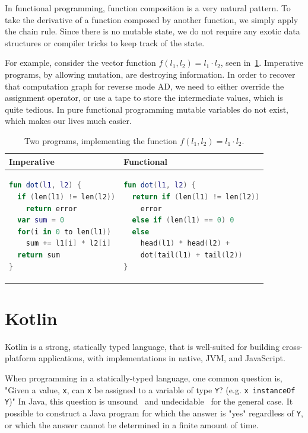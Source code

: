 \documentclass[12pt,initial,twoside,maitrise]{dms}
\numberwithin{equation}{section}
\numberwithin{table}{chapter}
\numberwithin{figure}{chapter}
\begin{document}
In functional programming, function composition is a very natural pattern. To take the derivative of a function composed by another function, we simply apply the chain rule. Since there is no mutable state, we do not require any exotic data structures or compiler tricks to keep track of the state.

For example, consider the vector function $f(l_1, l_2) = l_1 \cdot l_2$, seen in~\ref{tab:1}. Imperative programs, by allowing mutation, are destroying information. In order to recover that computation graph for reverse mode AD, we need to either override the assignment operator, or use a tape to store the intermediate values, which is quite tedious. In pure functional programming mutable variables do not exist, which makes our lives much easier.

\begin{table}[t]
    \centering
    \begin{tabular}{|l|l|}
        \hline
        Imperative & Functional \\
        \hline
        \begin{lstlisting}[language=Kotlin, linewidth=5.5cm]
fun dot(l1, l2) {
  if (len(l1) != len(l2))
    return error
  var sum = 0
  for(i in 0 to len(l1))
    sum += l1[i] * l2[i]
  return sum
}
        \end{lstlisting}
         &
        \begin{lstlisting}[language=Kotlin, linewidth=5.5cm]
fun dot(l1, l2) {
  return if (len(l1) != len(l2))
    error
  else if (len(l1) == 0) 0
  else
    head(l1) * head(l2) +
    dot(tail(l1) + tail(l2))
}
        \end{lstlisting} \\
        \hline
    \end{tabular}
    \caption{Two programs, implementing the function $f(l_1, l_2) = l_1 \cdot l_2$.}
    \label{tab:1}
\end{table}

\section{Kotlin}\label{sec:kotlin}

Kotlin is a strong, statically typed language, that is well-suited for building cross-platform applications, with implementations in native, JVM, and JavaScript.

When programming in a statically-typed language, one common question is, "Given a value, \texttt{x}, can \texttt{x} be assigned to a variable of type \texttt{Y}? (e.g. \texttt{x instanceOf Y})" In Java, this question is unsound~\cite{amin2016java} and undecidable~\cite{Grigore:2017:JGT:3009837.3009871} for the general case. It possible to construct a Java program for which the answer is "yes" regardless of \texttt{Y}, or which the answer cannot be determined in a finite amount of time.
\end{document}
